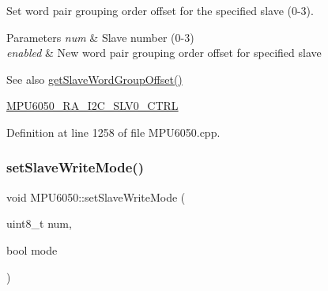 Set word pair grouping order offset for the specified slave (0-\/3). 
\begin{DoxyParams}{Parameters}
{\em num} & Slave number (0-\/3) \\
\hline
{\em enabled} & New word pair grouping order offset for specified slave \\
\hline
\end{DoxyParams}
\begin{DoxySeeAlso}{See also}
\mbox{\hyperlink{classMPU6050_a32ce8023bb80afc5d55811de70c7214f}{get\+Slave\+Word\+Group\+Offset()}} 

\mbox{\hyperlink{MPU6050_8h_a70ce4d71982a1e3fb2be9b71f40da786}{M\+P\+U6050\+\_\+\+R\+A\+\_\+\+I2\+C\+\_\+\+S\+L\+V0\+\_\+\+C\+T\+RL}} 
\end{DoxySeeAlso}


Definition at line 1258 of file M\+P\+U6050.\+cpp.


\begin{DoxyCode}{0}

\end{DoxyCode}
\mbox{\label{classMPU6050_a3d9bfcb5394c7a382009cd2dc91ce801}} 
\subsubsection{\texorpdfstring{setSlaveWriteMode()}{setSlaveWriteMode()}}
{\footnotesize\ttfamily void M\+P\+U6050\+::set\+Slave\+Write\+Mode (\begin{DoxyParamCaption}\item[{uint8\+\_\+t}]{num,  }\item[{bool}]{mode }\end{DoxyParamCaption})}

